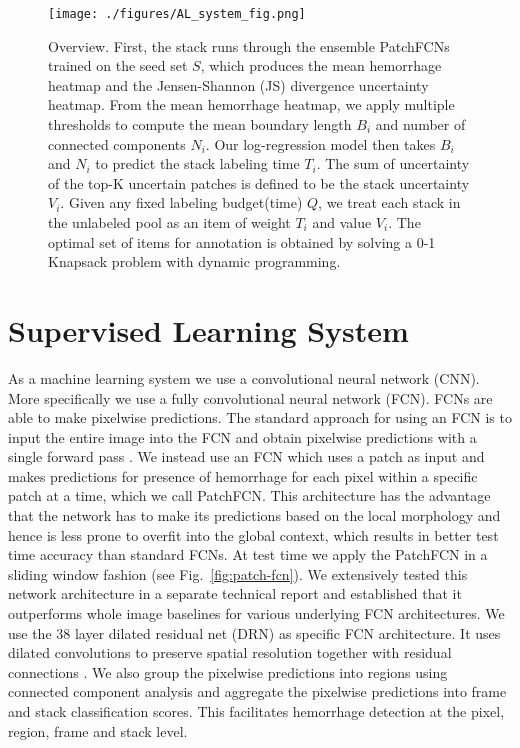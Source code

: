 \documentclass{llncs}
\begin{document}
\begin{figure}[t]
    \centering
    \texttt{[image: ./figures/AL\_system\_fig.png]}
    \vspace*{-0.3cm}
    \caption{Overview. %
    First, the stack runs through the ensemble PatchFCNs trained on the seed set $S$, which produces the mean hemorrhage heatmap and the Jensen-Shannon (JS) divergence uncertainty heatmap. From the mean hemorrhage heatmap, we apply multiple thresholds to compute the mean boundary length $B_i$ and number of connected components $N_i$. Our log-regression model then takes $B_i$ and $N_i$ to predict the stack labeling time $T_i$. The sum of uncertainty of the top-K uncertain patches is defined to be the stack uncertainty $V_i$. Given any fixed labeling budget(time) $Q$, we treat each stack in the unlabeled pool as an item of weight $T_i$ and value $V_i$. The optimal set of items for annotation is obtained by solving a 0-1 Knapsack problem with dynamic programming.
    }
    \vspace*{-0.3cm}
    \label{fig:system}
\end{figure}

\vspace*{-0.2cm}
\section{Supervised Learning System}
\vspace*{-0.2cm}

As a machine learning system we use a convolutional neural network (CNN). More specifically we use a fully convolutional neural network (FCN). FCNs are able to make pixelwise predictions. The standard approach for using an FCN is to input the entire image into the FCN and obtain pixelwise predictions with a single forward pass \cite{long2015fully,yuhmukherjeemanley2015resource}. We instead use an FCN which uses a patch as input and makes predictions for presence of hemorrhage for each pixel within a specific patch at a time, which we call PatchFCN. This architecture has the advantage that the network has to make its predictions based on the local morphology and hence is less prone to overfit into the global context, which results in better test time accuracy than standard FCNs. At test time we apply the PatchFCN in a sliding window fashion (see Fig.~\ref{fig:patch-fcn}). We extensively tested this network architecture in a separate technical report \cite{arxiv2018PatchFCN} and established that it outperforms whole image baselines for various underlying FCN architectures. We use the 38 layer dilated residual net (DRN) as specific FCN architecture. It uses dilated convolutions to preserve spatial resolution together with residual connections \cite{yu2017dilated}. We also group the pixelwise predictions into regions using connected component analysis and aggregate the pixelwise predictions into frame and stack classification scores. This facilitates hemorrhage detection at the pixel, region, frame and stack level.
\end{document}
